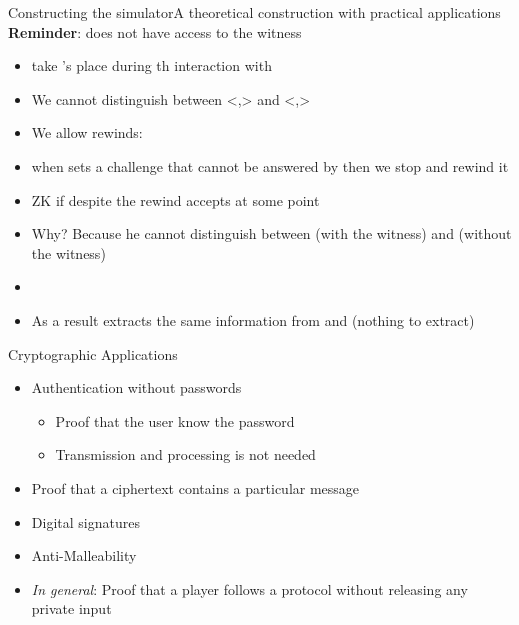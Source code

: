 \documentclass[handouts]{beamer}
\begin{document}
\begin{frame}{Constructing the simulator}{A theoretical construction with practical applications}
\textbf{Reminder}: \siml does not have access to the witness
\pause
\begin{small}
\begin{itemize}
\setlength\itemsep{0.01em}
\item \siml take \prv's place during th interaction with \ver 
\pause
\item We cannot distinguish between <\siml,\ver> and <\prv,\ver>
\pause
\item We allow rewinds:
\pause
\item when \ver sets a challenge that cannot be answered by \siml then we stop and rewind it
\pause
\item ZK if despite the rewind \ver accepts at some point
\pause
\item Why? \pause
Because he cannot distinguish between \prv (with the witness) and \siml (without the witness) 
\pause
\item {}
\pause
\item As a result \ver extracts the same information from \prv and \siml (nothing to extract)

\end{itemize}
\end{small}
\end{frame}

\begin{frame}{Cryptographic Applications}
\begin{itemize}
\item Authentication without passwords
\begin{itemize}
\item Proof that the user know the password
\item Transmission and processing is not needed
\end{itemize}
\pause
\item Proof that a ciphertext contains a particular message
\pause
\item Digital signatures
\item Anti-Malleability
\pause 
\item \emph{In general}: Proof that a player follows a protocol without releasing any private input
\end{itemize}
\end{frame}
\end{document}

